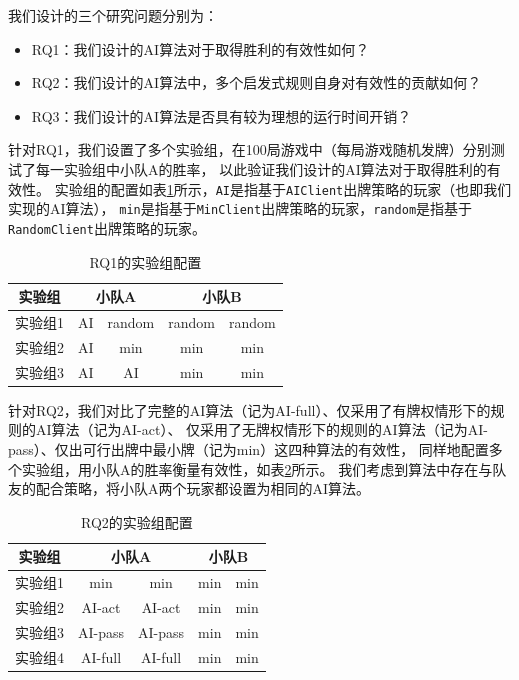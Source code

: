 \documentclass[a4paper]{ctexart}
\begin{document}
我们设计的三个研究问题分别为：
\begin{itemize}
	\item RQ1：我们设计的AI算法对于取得胜利的有效性如何？
	\item RQ2：我们设计的AI算法中，多个启发式规则自身对有效性的贡献如何？
	\item RQ3：我们设计的AI算法是否具有较为理想的运行时间开销？
\end{itemize}

针对RQ1，我们设置了多个实验组，在100局游戏中（每局游戏随机发牌）分别测试了每一实验组中小队A的胜率，
以此验证我们设计的AI算法对于取得胜利的有效性。
实验组的配置如表\ref{RQ1_config}所示，\texttt{AI}是指基于\texttt{AIClient}出牌策略的玩家（也即我们实现的AI算法），
\texttt{min}是指基于\texttt{MinClient}出牌策略的玩家，\texttt{random}是指基于\texttt{RandomClient}出牌策略的玩家。

\begin{table}
	\centering 
	\caption{RQ1的实验组配置}
	\label{RQ1_config}
	\begin{tabular}{|c|c|c|c|c|}
		\hline
		实验组   & \multicolumn{2}{c|}{小队A} & \multicolumn{2}{c|}{小队B} \\ \hline
		实验组1 & AI & random & random & random \\ \hline
		实验组2 & AI & min & min & min \\ \hline
		实验组3 & AI & AI & min & min \\ \hline
	\end{tabular}
\end{table}

针对RQ2，我们对比了完整的AI算法（记为AI-full）、仅采用了有牌权情形下的规则的AI算法（记为AI-act）、
仅采用了无牌权情形下的规则的AI算法（记为AI-pass）、仅出可行出牌中最小牌（记为min）这四种算法的有效性，
同样地配置多个实验组，用小队A的胜率衡量有效性，如表\ref{RQ2_config}所示。
我们考虑到算法中存在与队友的配合策略，将小队A两个玩家都设置为相同的AI算法。

\begin{table}
	\centering 
	\caption{RQ2的实验组配置}
	\label{RQ2_config}
	\begin{tabular}{|c|c|c|c|c|}
		\hline
		实验组   & \multicolumn{2}{c|}{小队A} & \multicolumn{2}{c|}{小队B} \\ \hline
		实验组1 & min & min & min & min \\ \hline
		实验组2 & AI-act & AI-act & min & min \\ \hline
		实验组3 & AI-pass & AI-pass & min & min \\ \hline
		实验组4 & AI-full & AI-full & min & min \\ \hline
	\end{tabular}
\end{table}
\end{document}
